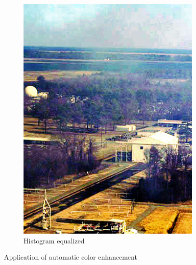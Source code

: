 \documentclass[12pt, a4paper, font = Times New Roman]{article}
\begin{document}
\begin{figure}[!h]
\begin{subfigure}[b]{0.3\textwidth}
    \includegraphics[width=\textwidth]{hist.jpg}
    \caption{Histogram equalized}
    \label{fig:hist_scene}
  \end{subfigure}
  \caption{Application of automatic color enhancement}
\end{figure}









\clearpage
\newpage
\nocite{*}
 

\end{document}
